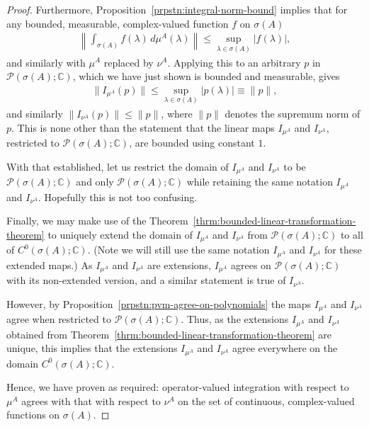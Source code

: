 \begin{proof}
Furthermore, Proposition~\ref{prpstn:integral-norm-bound} implies that for any bounded, measurable, complex-valued function $f$ on $\sigma(A)$
\begin{align}
    \left\| \int_{\sigma(A)} f(\lambda) \, d\mu^A(\lambda) \right\| \le \sup\limits_{\lambda \in \sigma(A)} \lvert f(\lambda) \rvert,
\end{align}
and similarly with $\mu^A$ replaced by $\nu^A$. Applying this to an arbitrary $p$ in $\mathcal{P}(\sigma(A); \mathbb{C})$, which we have just shown is bounded and measurable, gives
\begin{align}
    \| I_{\mu^A}(p) \| \le \sup\limits_{\lambda \in \sigma(A)} \lvert p(\lambda) \rvert \equiv \|p\|,
\end{align}
and similarly $\| I_{\nu^A}(p) \| \le \|p\|$, where $\|p\|$ denotes the supremum norm of $p$. This is none other than the statement that the linear maps $I_{\mu^A}$ and $I_{\nu^A}$, restricted to $\mathcal{P}(\sigma(A); \mathbb{C})$, are bounded using constant $1$.

With that established, let us restrict the domain of $I_{\mu^A}$ and $I_{\nu^A}$ to be $\mathcal{P}(\sigma(A); \mathbb{C})$ and only $\mathcal{P}(\sigma(A); \mathbb{C})$ while retaining the same notation $I_{\mu^A}$ and $I_{\nu^A}$. Hopefully this is not too confusing.

Finally, we may make use of the Theorem~\ref{thrm:bounded-linear-transformation-theorem} to uniquely extend the domain of $I_{\mu^A}$ and $I_{\nu^A}$ from $\mathcal{P}(\sigma(A); \mathbb{C})$ to all of $C^0(\sigma(A); \mathbb{C})$. (Note we will still use the same notation $I_{\mu^A}$ and $I_{\nu^A}$ for these extended maps.) As $I_{\mu^A}$ and $I_{\nu^A}$ are extensions, $I_{\mu^A}$ agrees on $\mathcal{P}(\sigma(A); \mathbb{C})$ with its non-extended version, and a similar statement is true of $I_{\nu^A}$.

However, by Proposition~\ref{prpstn:pvm-agree-on-polynomials} the maps $I_{\mu^A}$ and $I_{\nu^A}$ agree when restricted to $\mathcal{P}(\sigma(A); \mathbb{C})$. Thus, as the extensions $I_{\mu^A}$ and $I_{\nu^A}$ obtained from Theorem~\ref{thrm:bounded-linear-transformation-theorem} are unique, this implies that the extensions $I_{\mu^A}$ and $I_{\nu^A}$ agree everywhere on the domain $C^0(\sigma(A); \mathbb{C})$. 

Hence, we have proven as required: operator-valued integration with respect to $\mu^A$ agrees with that with respect to $\nu^A$ on the set of continuous, complex-valued functions on $\sigma(A)$.
\end{proof}

